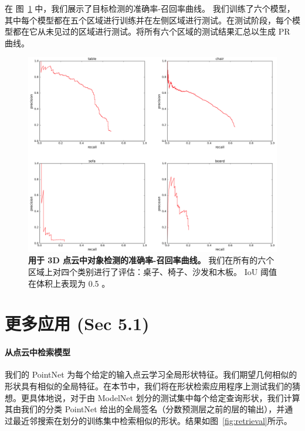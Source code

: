在 图~\ref{fig:pr_curve} 中，我们展示了目标检测的准确率-召回率曲线。 我们训练了六个模型，其中每个模型都在五个区域进行训练并在左侧区域进行测试。在测试阶段，每个模型都在它从未见过的区域进行测试。将所有六个区域的测试结果汇总以生成 PR 曲线。
 
 \begin{figure}
 \includegraphics[width=0.8\linewidth]{fig/pr_curve.png}
 \centering
 \caption{\textbf{用于 3D 点云中对象检测的准确率-召回率曲线。} 我们在所有的六个区域上对四个类别进行了评估：桌子、椅子、沙发和木板。 IoU 阈值在体积上表现为 0.5 。}
 \label{fig:pr_curve}
 \end{figure}
 
\section{更多应用 (Sec 5.1)}
\label{sec:supp_application}
\paragraph{从点云中检索模型} 我们的 PointNet 为每个给定的输入点云学习全局形状特征。我们期望几何相似的形状具有相似的全局特征。在本节中，我们将在形状检索应用程序上测试我们的猜想。更具体地说，对于由 ModelNet 划分的测试集中每个给定查询形状，我们计算其由我们的分类 PointNet 给出的全局签名（分数预测层之前的层的输出），并通过最近邻搜索在划分的训练集中检索相似的形状。结果如图~\ref{fig:retrieval}所示。

